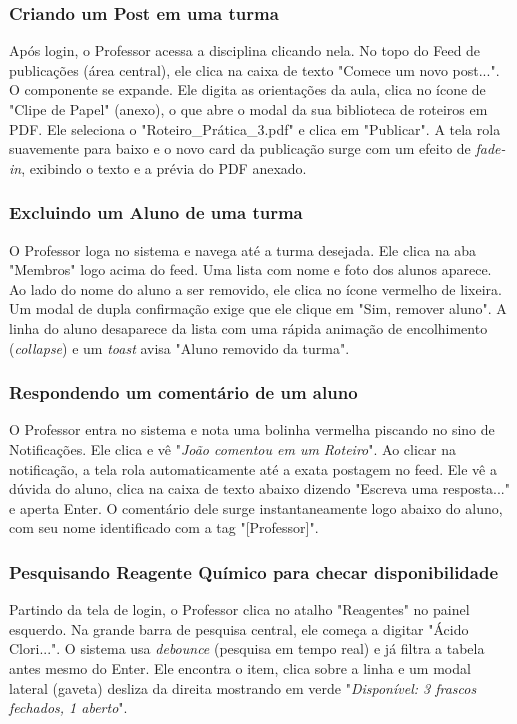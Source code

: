 \documentclass[12pt,a4paper]{article}
\begin{document}
\subsubsection{Criando um Post em uma turma}
Após login, o Professor acessa a disciplina clicando nela. No topo do Feed de publicações (área central), ele clica na caixa de texto "Comece um novo post...". O componente se expande. Ele digita as orientações da aula, clica no ícone de "Clipe de Papel" (anexo), o que abre o modal da sua biblioteca de roteiros em PDF. Ele seleciona o "Roteiro\_Prática\_3.pdf" e clica em "Publicar". A tela rola suavemente para baixo e o novo card da publicação surge com um efeito de \textit{fade-in}, exibindo o texto e a prévia do PDF anexado.

\subsubsection{Excluindo um Aluno de uma turma}
O Professor loga no sistema e navega até a turma desejada. Ele clica na aba "Membros" logo acima do feed. Uma lista com nome e foto dos alunos aparece. Ao lado do nome do aluno a ser removido, ele clica no ícone vermelho de lixeira. Um modal de dupla confirmação exige que ele clique em "Sim, remover aluno". A linha do aluno desaparece da lista com uma rápida animação de encolhimento (\textit{collapse}) e um \textit{toast} avisa "Aluno removido da turma".

\subsubsection{Respondendo um comentário de um aluno}
O Professor entra no sistema e nota uma bolinha vermelha piscando no sino de Notificações. Ele clica e vê "\textit{João comentou em um Roteiro}". Ao clicar na notificação, a tela rola automaticamente até a exata postagem no feed. Ele vê a dúvida do aluno, clica na caixa de texto abaixo dizendo "Escreva uma resposta..." e aperta Enter. O comentário dele surge instantaneamente logo abaixo do aluno, com seu nome identificado com a tag "[Professor]".

\subsubsection{Pesquisando Reagente Químico para checar disponibilidade}
Partindo da tela de login, o Professor clica no atalho "Reagentes" no painel esquerdo. Na grande barra de pesquisa central, ele começa a digitar "Ácido Clori...". O sistema usa \textit{debounce} (pesquisa em tempo real) e já filtra a tabela antes mesmo do Enter. Ele encontra o item, clica sobre a linha e um modal lateral (gaveta) desliza da direita mostrando em verde "\textit{Disponível: 3 frascos fechados, 1 aberto}".
\end{document}
